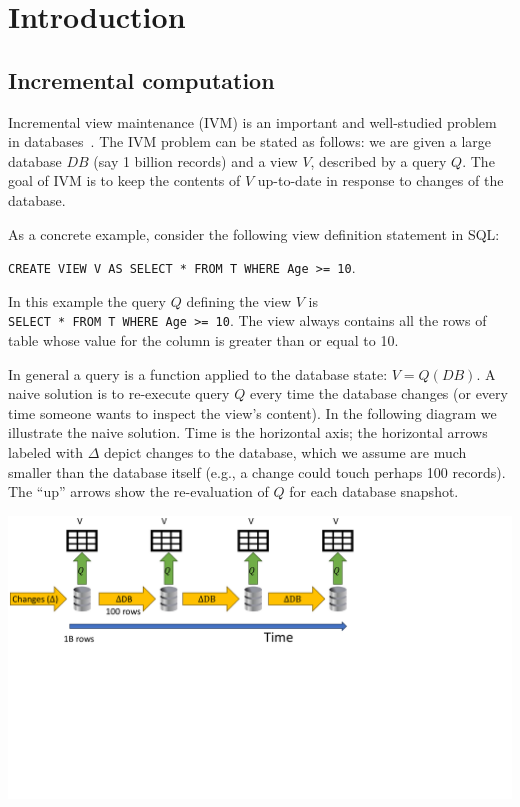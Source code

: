 \section{Introduction}\label{sec:introduction}

\subsection{Incremental computation}

Incremental view maintenance (IVM) is an important and well-studied
problem in databases~\cite{gupta-idb95}.  The IVM problem can be
stated as follows: we are given a large database $DB$ (say 1 billion
records) and a view $V$, described by a query $Q$.  The goal of IVM is
to keep the contents of $V$ up-to-date in response to changes of the
database.

As a concrete example, consider the following view definition
statement in SQL:

\texttt{CREATE VIEW V AS SELECT * FROM T WHERE Age >= 10}.

In this example the query $Q$ defining the view $V$ is
\\ \texttt{SELECT * FROM T WHERE Age >= 10}.  The view  always
contains all the rows of table  whose value for the column
 is greater than or equal to 10.

In general a query is a function applied to the database state: $V =
Q(DB)$.  A naive solution is to re-execute query $Q$ every time the
database changes (or every time someone wants to inspect the view's
content).  In the following diagram we illustrate the naive solution.
Time is the horizontal axis; the horizontal arrows labeled with
$\Delta$ depict changes to the database, which we assume are much
smaller than the database itself (e.g., a change could touch perhaps
100 records).  The ``up'' arrows show the re-evaluation of $Q$ for
each database snapshot.

\includegraphics[trim={0 3.8in 4in 0},clip,scale=.29]{view.pdf}

